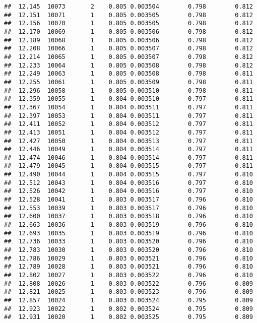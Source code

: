 \documentclass[
]{book}
\begin{document}
\begin{verbatim}
##  12.145  10073       2    0.805 0.003504        0.798        0.812
##  12.151  10071       1    0.805 0.003505        0.798        0.812
##  12.156  10070       1    0.805 0.003505        0.798        0.812
##  12.170  10069       1    0.805 0.003506        0.798        0.812
##  12.189  10068       1    0.805 0.003506        0.798        0.812
##  12.208  10066       1    0.805 0.003507        0.798        0.812
##  12.214  10065       1    0.805 0.003507        0.798        0.812
##  12.233  10064       1    0.805 0.003508        0.798        0.812
##  12.249  10063       1    0.805 0.003508        0.798        0.811
##  12.255  10061       1    0.805 0.003509        0.798        0.811
##  12.296  10058       1    0.805 0.003510        0.798        0.811
##  12.359  10055       1    0.804 0.003510        0.797        0.811
##  12.367  10054       1    0.804 0.003511        0.797        0.811
##  12.397  10053       1    0.804 0.003511        0.797        0.811
##  12.411  10052       1    0.804 0.003512        0.797        0.811
##  12.413  10051       1    0.804 0.003512        0.797        0.811
##  12.427  10050       1    0.804 0.003513        0.797        0.811
##  12.446  10049       1    0.804 0.003514        0.797        0.811
##  12.474  10046       1    0.804 0.003514        0.797        0.811
##  12.479  10045       1    0.804 0.003515        0.797        0.811
##  12.490  10044       1    0.804 0.003515        0.797        0.810
##  12.512  10043       1    0.804 0.003516        0.797        0.810
##  12.526  10042       1    0.804 0.003516        0.797        0.810
##  12.528  10041       1    0.803 0.003517        0.796        0.810
##  12.553  10039       1    0.803 0.003517        0.796        0.810
##  12.600  10037       1    0.803 0.003518        0.796        0.810
##  12.663  10036       1    0.803 0.003519        0.796        0.810
##  12.693  10035       1    0.803 0.003519        0.796        0.810
##  12.736  10033       1    0.803 0.003520        0.796        0.810
##  12.783  10030       1    0.803 0.003520        0.796        0.810
##  12.786  10029       1    0.803 0.003521        0.796        0.810
##  12.789  10028       1    0.803 0.003521        0.796        0.810
##  12.802  10027       1    0.803 0.003522        0.796        0.810
##  12.808  10026       1    0.803 0.003522        0.796        0.809
##  12.821  10025       1    0.803 0.003523        0.796        0.809
##  12.857  10024       1    0.803 0.003524        0.795        0.809
##  12.923  10022       1    0.802 0.003524        0.795        0.809
##  12.931  10020       1    0.802 0.003525        0.795        0.809

\end{verbatim}
\end{document}
